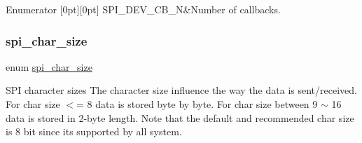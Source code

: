 \begin{DoxyEnumFields}{Enumerator}
[0pt][0pt]{}\mbox{\label{group__hpl__spi_gga0f0c72bc59abef8035904e8e267dfde9a2433e69f88c4631aebf9c7471420a747}} 
S\+P\+I\+\_\+\+D\+E\+V\+\_\+\+C\+B\+\_\+N&Number of callbacks. \\
\hline

\end{DoxyEnumFields}
\mbox{\label{group__hpl__spi_ga4a3ef460c2cea333834811806f32d60a}} 
\subsubsection{\texorpdfstring{spi\+\_\+char\+\_\+size}{spi\_char\_size}}
{\footnotesize\ttfamily enum \hyperlink{group__hpl__spi_ga4a3ef460c2cea333834811806f32d60a}{spi\+\_\+char\+\_\+size}}



S\+PI character sizes The character size influence the way the data is sent/received. For char size $<$= 8 data is stored byte by byte. For char size between 9 $\sim$ 16 data is stored in 2-\/byte length. Note that the default and recommended char size is 8 bit since it\textquotesingle{}s supported by all system. 

